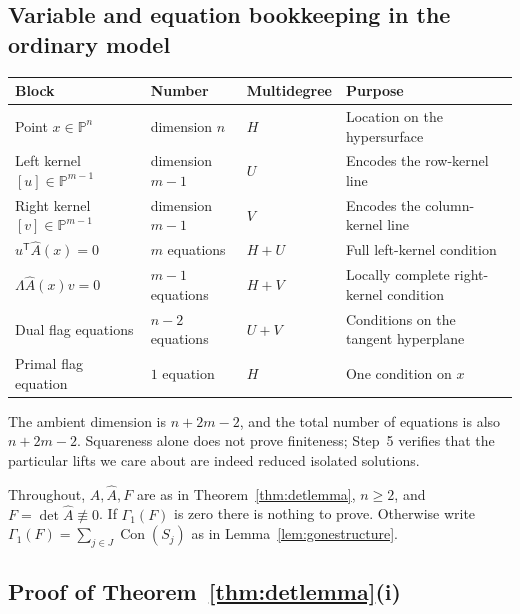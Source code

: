 \documentclass[acmsmall,screen,nonacm]{acmart}
\theoremstyle{definition}
\theoremstyle{remark}
\DeclareMathOperator{\Con}{Con}
\newcommand{\PP}{\mathbb{P}}
\newcommand{\Gone}{\Gamma_{\!1}}
\begin{document}
\subsection{Variable and equation bookkeeping in the ordinary model}

\begin{center}
\small
\begin{tabularx}{\textwidth}{@{}p{}p{}p{}X@{}}
\toprule
Block & Number & Multidegree & Purpose \\
\midrule
Point $x\in\PP^n$ & dimension $n$ & $H$ & Location on the hypersurface \\
Left kernel $[u]\in\PP^{m-1}$ & dimension $m-1$ & $U$ & Encodes the row-kernel line \\
Right kernel $[v]\in\PP^{m-1}$ & dimension $m-1$ & $V$ & Encodes the column-kernel line \\
$u^{\mathsf T}\widehat A(x)=0$ & $m$ equations & $H+U$ & Full left-kernel condition \\
$\Lambda\widehat A(x)v=0$ & $m-1$ equations & $H+V$ & Locally complete right-kernel condition \\
Dual flag equations & $n-2$ equations & $U+V$ & Conditions on the tangent hyperplane \\
Primal flag equation & $1$ equation & $H$ & One condition on $x$ \\
\bottomrule
\end{tabularx}
\end{center}
The ambient dimension is $n+2m-2$, and the total number of equations is also
$n+2m-2$.  Squareness alone does not prove finiteness; Step~5 verifies that
the particular lifts we care about are indeed reduced isolated solutions.

Throughout, $A,\widehat A,F$ are as in Theorem~\ref{thm:detlemma}, $n\ge2$, and $F=\det\widehat A\not\equiv0$.  If $\Gone(F)$ is zero there is nothing to prove.  Otherwise write $\Gone(F)=\sum_{j\in J}\Con(S_j)$ as in Lemma~\ref{lem:gonestructure}.

\subsection{Proof of Theorem~\ref{thm:detlemma}(i)}
\label{subsec:nonsymproof}
\end{document}
